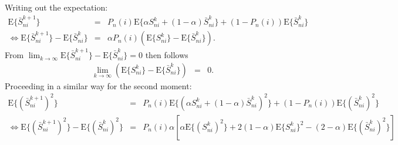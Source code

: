 Writing out the expectation:
\begin{eqnarray}
\text{E}\{\bar{S}_{ni}^{k+1}\} & = & P_{n}(i)\text{E}\{\alpha S_{ni}^{k}+(1-\alpha)\bar{S}_{ni}^{k}\}+(1-P_{n}(i))\text{E}\{\bar{S}_{ni}^{k}\}\\
\Leftrightarrow\text{E}\{\bar{S}_{ni}^{k+1}\}-\text{E}\{\bar{S}_{ni}^{k}\} & = & \alpha P_{n}(i)(\text{E}\{S_{ni}^{k}\}-\text{E}\{\bar{S}_{ni}^{k}\}).
\end{eqnarray}
From $\lim_{k\rightarrow\infty}\text{E}\{\bar{S}_{ni}^{k+1}\}-\text{E}\{\bar{S}_{ni}^{k}\}=0$
then follows
\begin{eqnarray}
\lim_{k\rightarrow\infty}\left(\text{E}\{S_{ni}^{k}\}-\text{E}\{\bar{S}_{ni}^{k}\}\right) & = & 0. \label{eq:first-score-moment}
\end{eqnarray}
%
Proceeding in a similar way for the second moment:
\begin{eqnarray}
\text{E}\{(\bar{S}_{ni}^{k+1})^{2}\} 
& = & 
P_{n}(i)\text{E}\{(\alpha S_{ni}^{k}+(1-\alpha)\bar{S}_{ni}^{k})^{2}\}+(1-P_{n}(i))\text{E}\{(\bar{S}_{ni}^{k})^{2}\}\\
\Leftrightarrow
\text{E}\{(\bar{S}_{ni}^{k+1})^{2}\}-\text{E}\{(\bar{S}_{ni}^{k})^{2}\} 
& = & P_{n}(i) \alpha \left[\alpha\text{E}\{(S_{ni}^{k})^{2}\}+2(1-\alpha)\text{E}\{S_{ni}^{k}\}^{2}-(2-\alpha)\text{E}\{(\bar{S}_{ni}^{k})^{2}\}\right]
\end{eqnarray}
